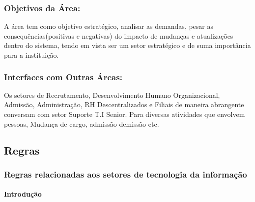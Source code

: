 \documentclass[a4paper,10pt,portuges]{sphinxmanual}
\begin{document}
\subsubsection{Objetivos da Área:}
\label{\detokenize{visao_geral:objetivos-da-area}}
\sphinxAtStartPar
A área tem como objetivo estratégico, analisar as demandas, pesar as
consequências(positivas e negativas) do impacto de mudanças e
atualizações dentro do sistema, tendo em vista ser um setor estratégico
e de suma importância para a instituição.


\subsubsection{Interfaces com Outras Áreas:}
\label{\detokenize{visao_geral:interfaces-com-outras-areas}}
\sphinxAtStartPar
Os setores de Recrutamento, Desenvolvimento Humano Organizacional,
Admissão, Administração, RH Descentralizados e Filiais de maneira
abrangente conversam com setor Suporte T.I Senior. Para diversas
atividades que envolvem pessoas, Mudança de cargo, admissão
demissão etc.

\noindent{}

\sphinxstepscope


\subsection{Regras}
\label{\detokenize{regras:regras}}\label{\detokenize{regras::doc}}

\subsubsection{Regras relacionadas aos setores de tecnologia da informação}
\label{\detokenize{regras:regras-relacionadas-aos-setores-de-tecnologia-da-informacao}}

\paragraph{Introdução}
\label{\detokenize{regras:introducao}}
\end{document}
